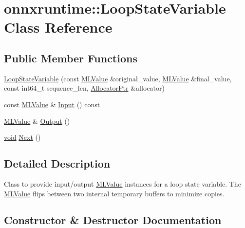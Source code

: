 \hypertarget{classonnxruntime_1_1LoopStateVariable}{}\section{onnxruntime\+:\+:Loop\+State\+Variable Class Reference}
\label{classonnxruntime_1_1LoopStateVariable}
\subsection*{Public Member Functions}
\begin{DoxyCompactItemize}
\item 
\mbox{\hyperlink{classonnxruntime_1_1LoopStateVariable_a3371d7e2d0114b53fd4a7447ed4eb8e6}{Loop\+State\+Variable}} (const \mbox{\hyperlink{classonnxruntime_1_1MLValue}{M\+L\+Value}} \&original\+\_\+value, \mbox{\hyperlink{classonnxruntime_1_1MLValue}{M\+L\+Value}} \&final\+\_\+value, const int64\+\_\+t sequence\+\_\+len, \mbox{\hyperlink{namespaceonnxruntime_a6cdac724c5dcefded3a63f08dae58fda}{Allocator\+Ptr}} \&allocator)
\item 
const \mbox{\hyperlink{classonnxruntime_1_1MLValue}{M\+L\+Value}} \& \mbox{\hyperlink{classonnxruntime_1_1LoopStateVariable_a0cad42b00c0c870f55e7e4f8f128e3f1}{Input}} () const
\item 
\mbox{\hyperlink{classonnxruntime_1_1MLValue}{M\+L\+Value}} \& \mbox{\hyperlink{classonnxruntime_1_1LoopStateVariable_a1d2635e8030adfcb688a39d8996584b2}{Output}} ()
\item 
\mbox{\hyperlink{mlasi_8h_a88f941d423cb2a819b70a1358982b1a6}{void}} \mbox{\hyperlink{classonnxruntime_1_1LoopStateVariable_a6f75bdd576a44b30f651cdd05c4a28a8}{Next}} ()
\end{DoxyCompactItemize}


\subsection{Detailed Description}
Class to provide input/output \mbox{\hyperlink{classonnxruntime_1_1MLValue}{M\+L\+Value}} instances for a loop state variable. The \mbox{\hyperlink{classonnxruntime_1_1MLValue}{M\+L\+Value}} flips between two internal temporary buffers to minimize copies. 

\subsection{Constructor \& Destructor Documentation}
\mbox{\label{classonnxruntime_1_1LoopStateVariable_a3371d7e2d0114b53fd4a7447ed4eb8e6}} 
